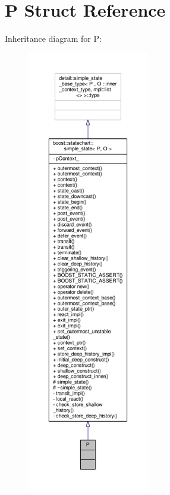 \hypertarget{struct_p}{}\section{P Struct Reference}
\label{struct_p}


Inheritance diagram for P\+:
\nopagebreak
\begin{figure}[H]
\begin{center}
\leavevmode
\includegraphics[height=550pt]{struct_p__inherit__graph}
\end{center}
\end{figure}



